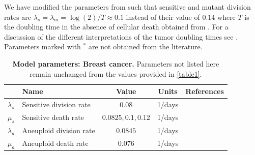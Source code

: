 \documentclass[12pt]{extarticle}
\begin{document}
\begin{table}
\begin{center}
{We have modified the parameters from \citet{bozic2013evolutionary} such that sensitive and mutant division rates are $\lambda_{s} = \lambda_{m} = \log{(2)}/T\approx0.1$ instead of their value of $0.14$ where $T$ is the doubling time in the absence of cellular death obtained from \citet{rew2000cell}. For a discussion of the different interpretations of the tumor doubling times see \citet{avanzini2019cancer}. Parameters marked with $^\ast$ are not obtained from the literature.} %
  \label{table1}
\end{center}
\end{table}

\begin{table}
\begin{center}
  \begin{tabular}{| l |p{5cm}| c | c | p{3cm} |}
    \hline
     & Name & Value & Units & References \\ \hline
    $\lambda_s$ & Sensitive division rate& 0.08 & 1/days  & \citet{salehi2021clonal} \\ \hline
    $\mu_s$ & Sensitive death rate& $0.0825, 0.1, 0.12$ & 1/days  & \citet{salehi2021clonal} \\ \hline
    $\lambda_a$  & Aneuploid division rate & $0.0845$ & 1/days  & \citet{spratt1996rates,rew2000cell}  \\ \hline
    $\mu_a$ & Aneuploid death rate & $0.076$ & 1/days  & \citet{spratt1996rates,rew2000cell}  \\ \hline
  \end{tabular}
\caption{\textbf{Model parameters: Breast cancer.} 
Parameters not listed here remain unchanged from the values provided in \cref{table1}.
}
  \label{table2}
\end{center}
\end{table}

\end{document}
